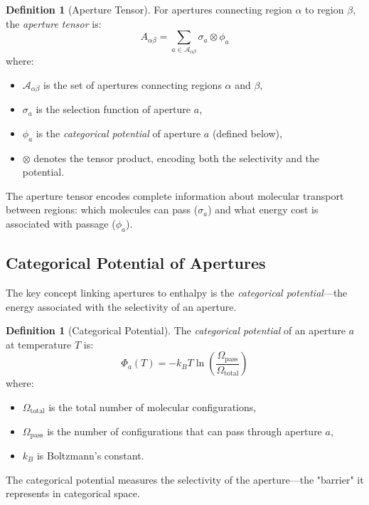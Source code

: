\documentclass[12pt,a4paper]{article}
\theoremstyle{definition}
\newtheorem{definition}[theorem]{Definition}
\theoremstyle{remark}
\begin{document}
\begin{definition}[Aperture Tensor]
\label{def:aperture_tensor}
For apertures connecting region $\alpha$ to region $\beta$, the \emph{aperture tensor} is:
\begin{equation}
A_{\alpha\beta} = \sum_{a \in \mathcal{A}_{\alpha\beta}} \sigma_a \otimes \phi_a
\end{equation}
where:
\begin{itemize}
    \item $\mathcal{A}_{\alpha\beta}$ is the set of apertures connecting regions $\alpha$ and $\beta$,
    \item $\sigma_a$ is the selection function of aperture $a$,
    \item $\phi_a$ is the \emph{categorical potential} of aperture $a$ (defined below),
    \item $\otimes$ denotes the tensor product, encoding both the selectivity and the potential.
\end{itemize}
\end{definition}

The aperture tensor encodes complete information about molecular transport between regions: which molecules can pass ($\sigma_a$) and what energy cost is associated with passage ($\phi_a$).

\subsection{Categorical Potential of Apertures}

The key concept linking apertures to enthalpy is the \emph{categorical potential}—the energy associated with the selectivity of an aperture.

\begin{definition}[Categorical Potential]
\label{def:categorical_potential}
The \emph{categorical potential} of an aperture $a$ at temperature $T$ is:
\begin{equation}
\Phi_a(T) = -k_B T \ln\left(\frac{\Omega_{\text{pass}}}{\Omega_{\text{total}}}\right)
\end{equation}
where:
\begin{itemize}
    \item $\Omega_{\text{total}}$ is the total number of molecular configurations,
    \item $\Omega_{\text{pass}}$ is the number of configurations that can pass through aperture $a$,
    \item $k_B$ is Boltzmann's constant.
\end{itemize}
The categorical potential measures the selectivity of the aperture—the "barrier" it represents in categorical space.
\end{definition}
\end{document}
